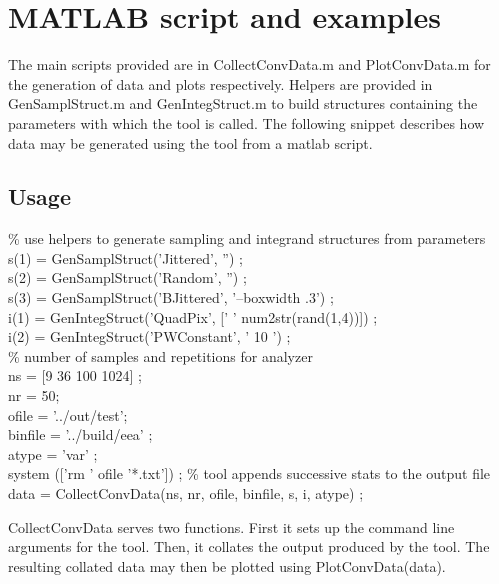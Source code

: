 \section{MATLAB script and examples}
The main scripts provided are in CollectConvData.m and PlotConvData.m for the generation of data and plots respectively. Helpers are provided in GenSamplStruct.m  and GenIntegStruct.m to build structures containing the parameters with which the tool is called. The following snippet describes how data may be generated using the tool from a matlab script. 
\subsection{Usage}
\begin{tcolorbox}
 \% use helpers to generate sampling and integrand structures from parameters\\
 s(1) = GenSamplStruct('Jittered', '') ; \\
 s(2) = GenSamplStruct('Random', '') ; \\
 s(3) = GenSamplStruct('BJittered', '--boxwidth .3') ; \\
 i(1) = GenIntegStruct('QuadPix', [' ' num2str(rand(1,4))]) ; \\
 i(2) = GenIntegStruct('PWConstant', ' 10 ') ; \\
 \% number of samples and repetitions for analyzer \\
 ns = [9 36 100 1024] ;\\
 nr =  50;\\
 ofile = '../out/test';\\
 binfile = '../build/eea' ;\\
 atype = 'var' ;\\
 system (['rm ' ofile '*.txt']) ; \% tool appends successive stats to the output file \\
 data = CollectConvData(ns, nr, ofile, binfile, s, i, atype) ;
\end{tcolorbox}
CollectConvData serves two functions. First it sets up the command line arguments for the tool. Then, it collates the output produced by the tool. The resulting collated data may then be plotted using PlotConvData(data).


